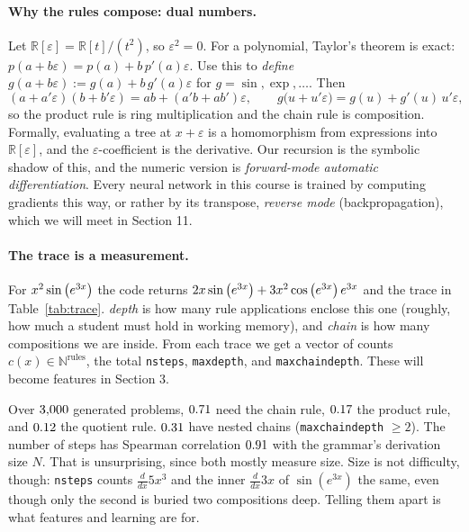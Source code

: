 \documentclass[11pt]{article}
\theoremstyle{definition}
\theoremstyle{plain}
\theoremstyle{remark}
\newcommand{\R}{\mathbb{R}}
\newcommand{\code}[1]{\texttt{#1}}
\renewcommand{\_}{\oldunderscore\allowbreak}
\begin{document}
\paragraph{Why the rules compose: dual numbers.}
Let $\R[\varepsilon]=\R[t]/(t^2)$, so $\varepsilon^2=0$. For a polynomial, Taylor's theorem is exact:
$p(a+b\varepsilon)=p(a)+b\,p'(a)\varepsilon$. Use this to \emph{define} $g(a+b\varepsilon):=g(a)+b\,g'(a)\varepsilon$
for $g=\sin,\exp,\ldots$. Then
\[
(a+a'\varepsilon)(b+b'\varepsilon)=ab+(a'b+ab')\varepsilon,\qquad
g\bigl(u+u'\varepsilon\bigr)=g(u)+g'(u)\,u'\varepsilon,
\]
so the product rule is ring multiplication and the chain rule is composition. Formally,
evaluating a tree at $x+\varepsilon$ is a homomorphism from expressions into $\R[\varepsilon]$, and the
$\varepsilon$-coefficient is the derivative. Our recursion is the symbolic shadow of this, and the
numeric version is \emph{forward-mode automatic differentiation}. Every neural network in this
course is trained by computing gradients this way, or rather by its transpose, \emph{reverse mode}
(backpropagation), which we will meet in Section 11.

\paragraph{The trace is a measurement.}
For $\TExProblem$ the code returns
$2 x \sin\left(e^{3 x}\right) + 3 x^{2} \cos\left(e^{3 x}\right) e^{3 x}$ and the trace in Table~\ref{tab:trace}.
\emph{depth} is how many rule applications enclose this one (roughly, how much a student
must hold in working memory), and \emph{chain} is how many compositions we are inside.
From each trace we get a vector of counts $c(x)\in\mathbb N^{\text{rules}}$, the total
\code{n\_steps}, \code{max\_depth}, and \code{max\_chain\_depth}. These will become features in Section 3.

\begin{table}[h]\centering\footnotesize

\caption{Trace of \code{derive} on $\TExProblem$, in the order the recursion visits nodes.}\label{tab:trace}
\end{table}

Over $3{,}000$ generated problems, $0.71$ need the chain rule, $0.17$ the product rule, and
$0.12$ the quotient rule. $0.31$ have nested chains (\code{max\_chain\_depth} $\ge2$). The number of
steps has Spearman correlation $0.91$ with the grammar's derivation size $N$. That is
unsurprising, since both mostly measure size. Size is not difficulty, though: \code{n\_steps}
counts $\frac{d}{dx}5x^3$ and the inner $\frac{d}{dx}3x$ of $\sin(e^{3x})$ the same, even though only the
second is buried two compositions deep. Telling them apart is what features and learning are for.
\end{document}
